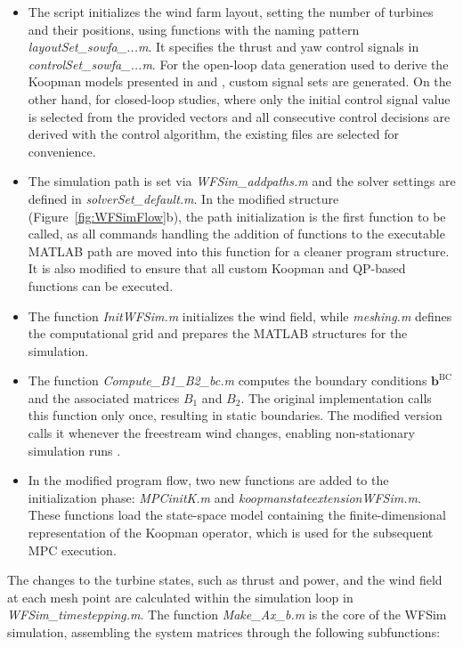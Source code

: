 \begin{itemize}\item The script initializes the wind farm layout, setting the number of turbines and their positions, using functions with the naming pattern \textit{layoutSet\_sowfa\_...m}. It specifies the thrust and yaw control signals in \textit{controlSet\_sowfa\_...m}. For the open-loop data generation used to derive the Koopman models presented in \cite{sharan2022Koopman} and \cite{dittmer2022data}, custom signal sets are generated. On the other hand, for closed-loop studies, where only the initial control signal value is selected from the provided vectors and all consecutive control decisions are derived with the control algorithm, the existing files are selected for convenience.
    
    \item The simulation path is set via \textit{WFSim\_addpaths.m} and the solver settings are defined in \textit{solverSet\_default.m}. In the modified structure (Figure~\ref{fig:WFSimFlow}b), the path initialization is the first function to be called, as all commands handling the addition of functions to the executable MATLAB path are moved into this function for a cleaner program structure. It is also modified to ensure that all custom Koopman and QP-based functions can be executed.
    
    \item The function \textit{InitWFSim.m} initializes the wind field, while \textit{meshing.m} defines the computational grid and prepares the MATLAB structures for the simulation.
    
    \item The function \textit{Compute\_B1\_B2\_bc.m} computes the boundary conditions $\bm{b}^\mathrm{BC}$ and the associated matrices $B_1$ and $B_2$. The original implementation calls this function only once, resulting in static boundaries. The modified version calls it whenever the freestream wind changes, enabling non-stationary simulation runs \cite{dittmer2022data}.
    
    \item In the modified program flow, two new functions are added to the initialization phase: \textit{MPCinitK.m} and \textit{koopmanstateextensionWFSim.m}. These functions load the state-space model containing the finite-dimensional representation of the Koopman operator, which is used for the subsequent MPC execution.
\end{itemize}
The changes to the turbine states, such as thrust and power, and the wind field at each mesh point are calculated within the simulation loop in \textit{WFSim\_timestepping.m}. The function \textit{Make\_Ax\_b.m} is the core of the WFSim simulation, assembling the system matrices through the following subfunctions:

